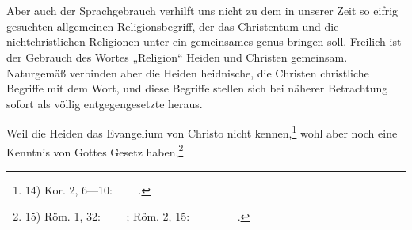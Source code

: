 \setcounter{page}{7}
\section*{}

Aber auch der Sprachgebrauch verhilft uns nicht zu dem in unserer Zeit so eifrig gesuchten allgemeinen Religionsbegriff, der das Christentum und die nichtchristlichen Religionen unter ein gemeinsames genus bringen soll. Freilich ist der Gebrauch des Wortes „Religion“ Heiden und Christen gemeinsam. Naturgemäß verbinden aber die Heiden heidnische, die Christen christliche Begriffe mit dem Wort, und diese Begriffe stellen sich bei näherer Betrachtung sofort als völlig entgegengesetzte heraus.

Weil die Heiden das Evangelium von Christo nicht kennen,\footnote{14) Kor. 2, 6—10: \textalpha\textnu\textiota\ \textkappa\textalpha\textiota\textrho\textiota\textomega\ \textalpha\textnu\texttheta\textrho\textomega\textpi\textomega\textnu\ \textomicron\textupsilon\textkappa\ \textalpha\textnu\textepsilon\textbeta\texteta.}
wohl aber noch eine Kenntnis von Gottes Gesetz haben,\footnote{15) Röm. 1, 32: \texttau\textomicron\ \textdelta\textiota\textkappa\textalpha\textiota\textomega\textmu\textalpha\ \texttau\textomicron\textupsilon\ \textTheta\textepsilon\textomicron\textupsilon\ \textepsilon\textpi\textiota\textgamma\textnu\textomega\textnu\texttau\textepsilon\textsigmaf; Röm. 2, 15: \textepsilon\textnu\textdelta\textepsilon\textiota\textxi\textiota\textnu\ \texttau\textomicron\textupsilon\ \texttau\textomicron\textmu\textomicron\textupsilon\ \textnu\textomicron\textmu\textomega\textnu\ \textgamma\textrho\textalpha\textpi\texttau\textomicron\textupsilon\ \textepsilon\textnu\ \texttau\textalpha\textiota\textsigmaf\ \textkappa\textalpha\textrho\textdelta\textiota\textalpha\textiota\textsigmaf\ \textalpha\textupsilon\texttau\textomega\textnu.}
